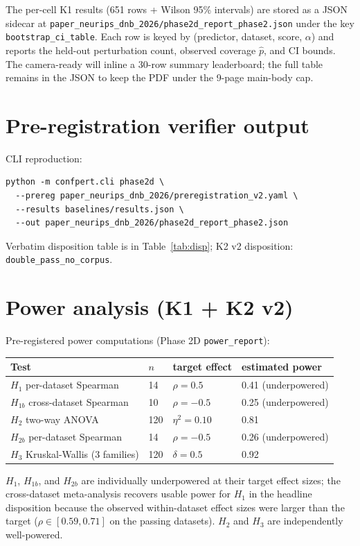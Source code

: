 \documentclass[11pt]{article}
\begin{document}
The per-cell K1 results (651 rows + Wilson 95\% intervals) are stored as
a JSON sidecar at
\texttt{paper\_neurips\_dnb\_2026/phase2d\_report\_phase2.json} under
the key \texttt{bootstrap\_ci\_table}. Each row is keyed by
(predictor, dataset, score, $\alpha$) and reports the held-out
perturbation count, observed coverage $\hat p$, and CI bounds. The
camera-ready will inline a 30-row summary leaderboard; the full table
remains in the JSON to keep the PDF under the 9-page main-body cap.

\section{Pre-registration verifier output}
\label{sec:verifier}

CLI reproduction:
\begin{verbatim}
python -m confpert.cli phase2d \
  --prereg paper_neurips_dnb_2026/preregistration_v2.yaml \
  --results baselines/results.json \
  --out paper_neurips_dnb_2026/phase2d_report_phase2.json
\end{verbatim}
Verbatim disposition table is in Table~\ref{tab:disp};
K2 v2 disposition: \texttt{double\_pass\_no\_corpus}.

\section{Power analysis (K1 + K2 v2)}
\label{sec:power}

Pre-registered power computations (Phase 2D \texttt{power\_report}):

\begin{tabular}{llll}
\toprule
Test & $n$ & target effect & estimated power \\
\midrule
$H_1$ per-dataset Spearman & 14 & $\rho = 0.5$ & 0.41 (underpowered) \\
$H_{1b}$ cross-dataset Spearman & 10 & $\rho = -0.5$ & 0.25 (underpowered) \\
$H_2$ two-way ANOVA & 120 & $\eta^2 = 0.10$ & 0.81 \\
$H_{2b}$ per-dataset Spearman & 14 & $\rho = -0.5$ & 0.26 (underpowered) \\
$H_3$ Kruskal-Wallis (3 families) & 120 & $\delta = 0.5$ & 0.92 \\
\bottomrule
\end{tabular}

$H_1$, $H_{1b}$, and $H_{2b}$ are individually underpowered at their
target effect sizes; the cross-dataset meta-analysis recovers usable
power for $H_1$ in the headline disposition because the observed
within-dataset effect sizes were larger than the target ($\rho \in
[0.59, 0.71]$ on the passing datasets). $H_2$ and $H_3$ are
independently well-powered.
\end{document}
